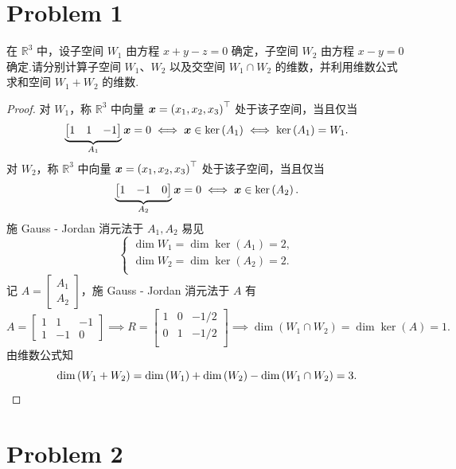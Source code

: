 \section*{Problem 1}

在 $\mathbb{R}^3$ 中，设子空间 $W_1$ 由方程 $x+y-z=0$ 确定，子空间 $W_2$ 由方程 $x-y=0$ 确定.请分别计算子空间 $W_1$、$W_2$ 以及交空间 $W_1 \cap W_2$ 的维数，并利用维数公式求和空间 $W_1 + W_2$ 的维数.

\begin{proof}
对 $W_1$，称 $\mathbb{R}^3$ 中向量 $\boldsymbol{x} = \left(x_1, x_2, x_3\right)^\top$ 处于该子空间，当且仅当
\[
\underbrace{\begin{bmatrix}
    1 & 1 & -1
\end{bmatrix}}_{A_1} \boldsymbol{x} = 0 \iff \boldsymbol{x} \in \ker \left(A_1\right) \iff \ker \left(A_1\right) = W_1.
\]
对 $W_2$，称 $\mathbb{R}^3$ 中向量 $\boldsymbol{x} = \left(x_1, x_2, x_3\right)^\top$ 处于该子空间，当且仅当
\[
\underbrace{\begin{bmatrix}
    1 & -1 & 0
\end{bmatrix}}_{A_2} \boldsymbol{x} = 0 \iff \boldsymbol{x} \in \ker \left(A_2\right).
\]
施 Gauss - Jordan 消元法于 $A_1, A_2$ 易见
\[
\begin{cases}
    \dim W_1 = \dim \ker \left(A_1\right) = 2, \\
    \dim W_2 = \dim \ker \left(A_2\right) = 2. \\
\end{cases}
\]
记 $A = \begin{bmatrix}
    A_1 \\
    A_2
\end{bmatrix}$，施 Gauss - Jordan 消元法于 $A$ 有
\[
A = \begin{bmatrix}
    1 & 1 & -1 \\
    1 & -1 & 0
\end{bmatrix}
\implies
R = \begin{bmatrix}
    1 & 0 & -1/2 \\
    0 & 1 & -1/2 \\
\end{bmatrix}
\implies
\dim \left(W_1 \cap W_2\right) = \dim \ker \left(A\right) = 1.
\]
由维数公式知
\[
\dim \left(W_1 + W_2\right) = \dim \left(W_1\right) + \dim \left(W_2\right) - \dim \left(W_1 \cap W_2\right) = 3. \\
\]
\end{proof}

\section*{Problem 2}

